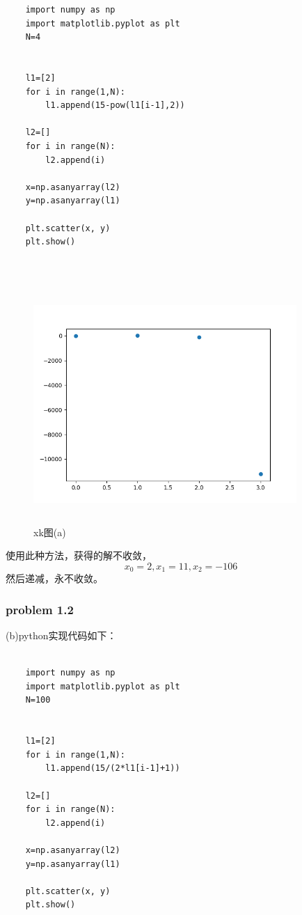 \documentclass[UTF8]{ctexart}
\begin{document}
\begin{lstlisting}
	import numpy as np
	import matplotlib.pyplot as plt
	N=4


	l1=[2]
	for i in range(1,N):
	    l1.append(15-pow(l1[i-1],2))

	l2=[]
	for i in range(N):
	    l2.append(i)

	x=np.asanyarray(l2)
	y=np.asanyarray(l1)

	plt.scatter(x, y)
	plt.show()



\end{lstlisting}

\begin{figure}[H]
 \centering
  \includegraphics[width=10cm,height=9cm]{2-1-1.png}
  \caption{xk图(a)}
\end{figure}



使用此种方法，获得的解不收敛，$$x_0=2,x_1=11,x_2=-106$$然后递减，永不收敛。


\subsubsection{problem 1.2}

(b)python实现代码如下：

\begin{lstlisting}

	import numpy as np
	import matplotlib.pyplot as plt
	N=100


	l1=[2]
	for i in range(1,N):
	    l1.append(15/(2*l1[i-1]+1))

	l2=[]
	for i in range(N):
	    l2.append(i)

	x=np.asanyarray(l2)
	y=np.asanyarray(l1)

	plt.scatter(x, y)
	plt.show()
\end{lstlisting}
\end{document}
